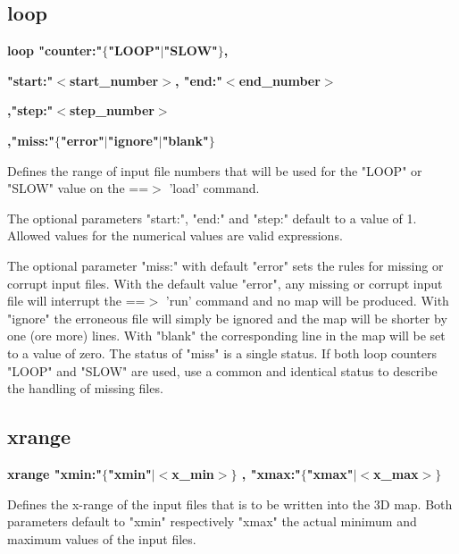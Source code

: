 \subsection*{loop}
{\bf loop "counter:"$ \{$"LOOP"$| $"SLOW"$\} $, \par }
{\bf      "start:"$ <$start\_number$> $, "end:"$ <$end\_number$> $ \par }
{\bf      ,"step:"$ <$step\_number$> $ \par }
{\bf      ,"miss:"$ \{$"error"$| $"ignore"$| $"blank"$\} $ \par }
\par
\vspace{3pt}
Defines the range of input file numbers that will be used 
for the "LOOP"  or "SLOW" value on the ==$> $ 'load' command. 
\par
The optional parameters "start:", "end:" and "step:" 
default to a value of 1. 
Allowed values for the numerical values are valid expressions. 
\par
The optional parameter "miss:" with default "error" 
sets the rules for missing or corrupt input files. 
With the default value "error", any missing or corrupt 
input file will interrupt the ==$> $ 'run' command and 
no map will be produced. 
With "ignore" the erroneous file will simply be ignored 
and the map will be shorter by one (ore more) lines. 
With "blank" the corresponding line in the map will be 
set to a value of zero. 
The status of "miss" is a single status. If both loop 
counters "LOOP" and "SLOW" are used, use a common and 
identical status to describe the handling of missing 
files. 
\subsection*{xrange}
{\bf xrange "xmin:"$ \{$"xmin"$| $$ <$x\_min$> $$\} $ , "xmax:"$ \{$"xmax"$| $$ <$x\_max$> $$\} $ \par }
\par
\vspace{3pt}
Defines the x-range of the input files that is to be 
written into the 3D map. 
Both parameters default to "xmin" respectively "xmax" 
the actual minimum and maximum values of the input files. 

